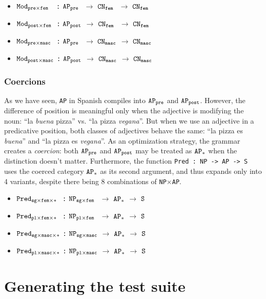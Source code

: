 \documentclass[runningheads]{llncs}
\def\t#1{\texttt{#1}}
\newcommand{\quality}[1]{${\tt AP_{#1}}$}
\newcommand{\kind}[1]{${\tt CN_{#1}}$}
\newcommand{\comment}{${\tt S}$}
\newcommand{\mod}[2]{${\tt Mod_{#1\times#2}}$}
\newcommand{\pred}[3]{${\tt Pred_{#1\times#2\times#3}}$}
\newcommand{\itemSpa}[2]{${\tt NP_{#1\times#2}}$}
\begin{document}
\begin{itemize}
\item \mod{pre}{fem~~} \t{:} \quality{pre~} $\rightarrow$ \kind{fem~} $\rightarrow$ \kind{fem}
\item  \mod{post}{fem~} \t{:} \quality{post} $\rightarrow$ \kind{fem~} $\rightarrow$ \kind{fem}
\item  \mod{pre}{masc~~}\t{:} \quality{pre~} $\rightarrow$ \kind{masc} $\rightarrow$ \kind{masc}
\item \mod{post}{masc} \t{:} \quality{post} $\rightarrow$ \kind{masc} $\rightarrow$ \kind{masc}
\end{itemize}


\subsubsection{Coercions}
\label{sec:Coercions}
As we have seen, \t{AP} in Spanish compiles into \quality{pre} and
\quality{post}. However, the difference of position is meaningful only when the
adjective is modifying the noun: ``la \emph{buena} pizza'' vs. ``la pizza
\emph{vegana}''. But when we use an adjective in a predicative position, both
classes of adjectives behave the same: ``la pizza es \emph{buena}''
and ``la pizza es \emph{vegana}''. As an optimization strategy, the
grammar creates a {\it coercion}: both \quality{pre} and \quality{post}
may be treated as \quality{*} when the distinction doesn't matter. 
Furthermore, the function \t{Pred : NP -> AP -> S} uses
the coerced category \quality{*} as its second argument, and thus
expands only into 4 variants, despite there being 8 combinations of
\t{NP}$\times$\t{AP}.

\begin{itemize}
\item \pred{sg}{fem}{*~} \t{:} \itemSpa{sg}{fem~} $\rightarrow$ \quality{*} $\rightarrow$ \comment
\item  \pred{pl}{fem}{*~} \t{:} \itemSpa{pl}{fem~} $\rightarrow$ \quality{*} $\rightarrow$ \comment
\item  \pred{sg}{masc}{*} \t{:} \itemSpa{sg}{masc} $\rightarrow$ \quality{*} $\rightarrow$ \comment
\item \pred{pl}{masc}{*} \t{:} \itemSpa{pl}{masc} $\rightarrow$ \quality{*} $\rightarrow$ \comment
\end{itemize}

\section{Generating the test suite}
\label{sec:testing}
\end{document}
